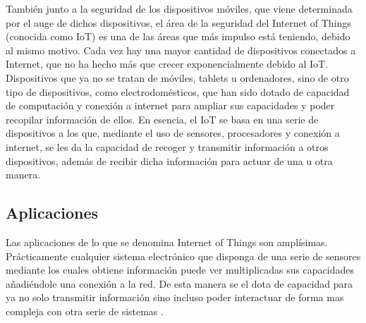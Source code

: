 También junto a la seguridad de los dispositivos móviles, que viene determinada por el auge de dichos dispositivos, el área de la seguridad del Internet of Things (conocida como IoT) es una de las áreas que más impulso está teniendo, debido al mismo motivo. Cada vez hay una mayor cantidad de dispositivos conectados a Internet, que no ha hecho más que crecer exponencialmente debido al IoT. Dispositivos que ya no se tratan de móviles, tablets u ordenadores, sino de otro tipo de dispositivos, como electrodomésticos, que han sido dotado de capacidad de computación y conexión a internet para ampliar sus capacidades y poder recopilar información de ellos. En esencia, el IoT se basa en una serie de dispositivos a los que, mediante el uso de sensores, procesadores y conexión a internet, se les da la capacidad de recoger y transmitir información a otros dispositivos, además de recibir dicha información para actuar de una u otra manera.

\subsection{Aplicaciones}

Las aplicaciones de lo que se denomina Internet of Things son amplísimas. Prácticamente cualquier sistema electrónico que disponga de una serie de sensores mediante los cuales obtiene información puede ver multiplicadas sus capacidades añadiéndole una conexión a la red. De esta manera se el dota de capacidad para ya no solo transmitir información sino incluso poder interactuar de forma mas compleja con otra serie de sistemas \cite{Miorandi20121497} \cite{Gubbi20131645}.

